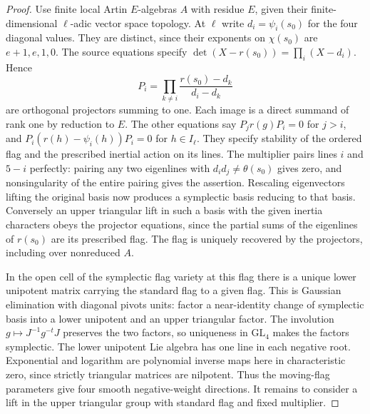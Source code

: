 \begin{proof}
Use finite local Artin \(E\)-algebras \(A\) with residue \(E\),
given their finite-dimensional \(\ell\)-adic vector space topology.
At \(\ell\) write \(d_i=\psi_i(s_0)\) for the four diagonal values.
They are distinct, since their exponents on \(\chi(s_0)\) are
\(e+1,e,1,0\). The source equations specify
\(\det(X-r(s_0))=\prod_i(X-d_i)\). Hence
\[
 P_i=\prod_{k\ne i}\frac{r(s_0)-d_k}{d_i-d_k}
\]
are orthogonal projectors summing to one. Each image is a direct
summand of rank one by reduction to \(E\). The other equations say
\(P_jr(g)P_i=0\) for \(j>i\), and
\(P_i(r(h)-\psi_i(h))P_i=0\) for \(h\in I_\ell\). They specify
stability of the ordered flag and the prescribed inertial action on
its lines. The multiplier pairs lines \(i\) and \(5-i\) perfectly:
pairing any two eigenlines with \(d_i d_j\ne\theta(s_0)\) gives zero,
and nonsingularity of the entire pairing gives the assertion.
Rescaling eigenvectors lifting the original basis now produces a
symplectic basis reducing to that basis. Conversely an upper
triangular lift in such a basis with the given inertia characters
obeys the projector equations, since the partial sums of the
eigenlines of \(r(s_0)\) are its prescribed flag. The flag is
uniquely recovered by the projectors, including over nonreduced \(A\).

In the open cell of the symplectic flag variety at this flag there
is a unique lower unipotent matrix carrying the standard flag to a
given flag. This is Gaussian elimination with diagonal pivots units:
factor a near-identity change of symplectic basis into a lower
unipotent and an upper triangular factor. The involution
\(g\mapsto J^{-1}g^{-t}J\) preserves the two factors, so uniqueness
in \(\mathrm{GL}_4\) makes the factors symplectic. The lower
unipotent Lie algebra has one line in each negative root. Exponential
and logarithm are polynomial inverse maps here in characteristic
zero, since strictly triangular matrices are nilpotent. Thus the
moving-flag parameters give four smooth negative-weight directions.
It remains to consider a lift in the upper triangular group with
standard flag and fixed multiplier.


\end{proof}
